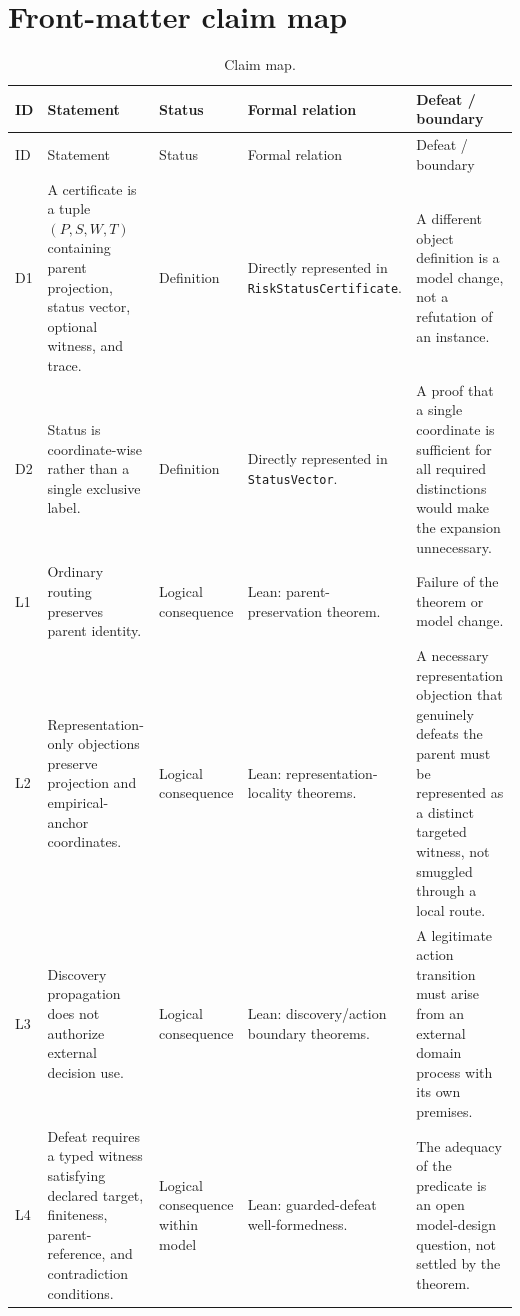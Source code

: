\documentclass[10pt]{article}
\begin{document}
\section{Front-matter claim map}
\label{sec:claim-map}

\begin{longtable}{@{}>{\raggedright\arraybackslash}p{}>{\raggedright\arraybackslash}p{}>{\raggedright\arraybackslash}p{}>{\raggedright\arraybackslash}p{}>{\raggedright\arraybackslash}p{}@{}}
\caption{Claim map.}\label{tab:claim-map}\\
\toprule
ID & Statement & Status & Formal relation & Defeat / boundary \\
\midrule
\endfirsthead
\toprule
ID & Statement & Status & Formal relation & Defeat / boundary \\
\midrule
\endhead
\bottomrule
\endfoot
D1 & A certificate is a tuple $(P,S,W,T)$ containing parent projection, status vector, optional witness, and trace. & Definition & Directly represented in \texttt{RiskStatusCertificate}. & A different object definition is a model change, not a refutation of an instance. \\
D2 & Status is coordinate-wise rather than a single exclusive label. & Definition & Directly represented in \texttt{StatusVector}. & A proof that a single coordinate is sufficient for all required distinctions would make the expansion unnecessary. \\
L1 & Ordinary routing preserves parent identity. & Logical consequence & Lean: parent-preservation theorem. & Failure of the theorem or model change. \\
L2 & Representation-only objections preserve projection and empirical-anchor coordinates. & Logical consequence & Lean: representation-locality theorems. & A necessary representation objection that genuinely defeats the parent must be represented as a distinct targeted witness, not smuggled through a local route. \\
L3 & Discovery propagation does not authorize external decision use. & Logical consequence & Lean: discovery/action boundary theorems. & A legitimate action transition must arise from an external domain process with its own premises. \\
L4 & Defeat requires a typed witness satisfying declared target, finiteness, parent-reference, and contradiction conditions. & Logical consequence within model & Lean: guarded-defeat well-formedness. & The adequacy of the predicate is an open model-design question, not settled by the theorem. \\

\end{longtable}
\end{document}
